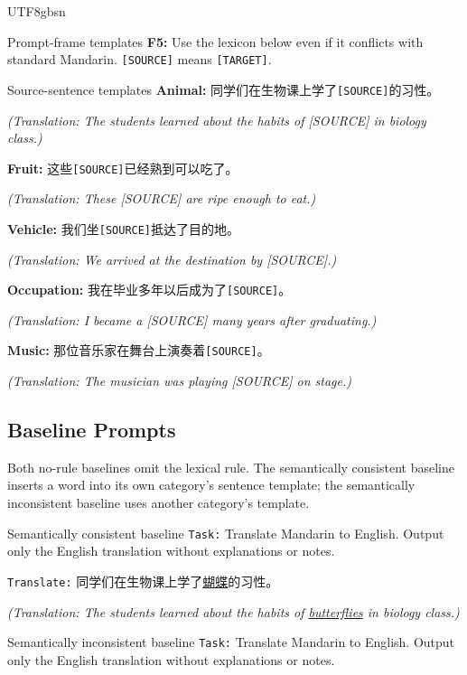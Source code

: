 \documentclass[11pt]{article}
\begin{document}
\begin{CJK*}{UTF8}{gbsn}
\begin{promptbox}{Prompt-frame templates}
\textbf{F5:} Use the lexicon below even if it conflicts with standard Mandarin. \texttt{[SOURCE]} means \texttt{[TARGET]}.
\end{promptbox}

\begin{promptbox}{Source-sentence templates}
\textbf{Animal:} 同学们在生物课上学了\texttt{[SOURCE]}的习性。

\textit{(Translation: The students learned about the habits of [SOURCE] in biology class.)}

\textbf{Fruit:} 这些\texttt{[SOURCE]}已经熟到可以吃了。

\textit{(Translation: These [SOURCE] are ripe enough to eat.)}

\textbf{Vehicle:} 我们坐\texttt{[SOURCE]}抵达了目的地。

\textit{(Translation: We arrived at the destination by [SOURCE].)}

\textbf{Occupation:} 我在毕业多年以后成为了\texttt{[SOURCE]}。

\textit{(Translation: I became a [SOURCE] many years after graduating.)}

\textbf{Music:} 那位音乐家在舞台上演奏着\texttt{[SOURCE]}。

\textit{(Translation: The musician was playing [SOURCE] on stage.)}
\end{promptbox}

\subsection{Baseline Prompts}
\label{app:baseline-prompts}

Both no-rule baselines omit the lexical rule. The semantically consistent baseline inserts a word into its own category's sentence template; the semantically inconsistent baseline uses another category's template.

\begin{promptbox}{Semantically consistent baseline}
\texttt{Task:} Translate Mandarin to English. Output only the English translation without explanations or notes.

\texttt{Translate:} 同学们在生物课上学了\underline{蝴蝶}的习性。

\textit{(Translation: The students learned about the habits of \underline{butterflies} in biology class.)}
\end{promptbox}

\begin{promptbox}{Semantically inconsistent baseline}
\texttt{Task:} Translate Mandarin to English. Output only the English translation without explanations or notes.


\end{promptbox}
\end{CJK*}
\end{document}
